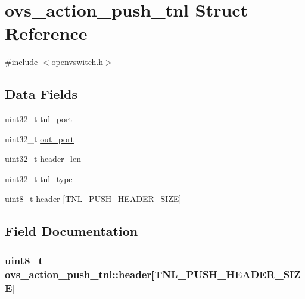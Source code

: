 \hypertarget{structovs__action__push__tnl}{}\section{ovs\+\_\+action\+\_\+push\+\_\+tnl Struct Reference}
\label{structovs__action__push__tnl}


{\ttfamily \#include $<$openvswitch.\+h$>$}

\subsection*{Data Fields}
\begin{DoxyCompactItemize}
\item 
uint32\+\_\+t \hyperlink{structovs__action__push__tnl_a075797c91bf16f67b0e99d00733de09c}{tnl\+\_\+port}
\item 
uint32\+\_\+t \hyperlink{structovs__action__push__tnl_a314ef1909bc176d1fe3f6588d24edfde}{out\+\_\+port}
\item 
uint32\+\_\+t \hyperlink{structovs__action__push__tnl_ae17c0fbdac67f4393a1bf5cc463caa61}{header\+\_\+len}
\item 
uint32\+\_\+t \hyperlink{structovs__action__push__tnl_a5a768ff0a623d03bc2b4d13db4bd4413}{tnl\+\_\+type}
\item 
uint8\+\_\+t \hyperlink{structovs__action__push__tnl_a722b423a78230e5e3dcf8586538404a5}{header} \mbox{[}\hyperlink{openvswitch_8h_a20584c44e8d74e782a3a777dcf26dfc9}{T\+N\+L\+\_\+\+P\+U\+S\+H\+\_\+\+H\+E\+A\+D\+E\+R\+\_\+\+S\+I\+Z\+E}\mbox{]}
\end{DoxyCompactItemize}


\subsection{Field Documentation}
\hypertarget{structovs__action__push__tnl_a722b423a78230e5e3dcf8586538404a5}{}
\subsubsection[{header}]{\setlength{\rightskip}{0pt plus 5cm}uint8\+\_\+t ovs\+\_\+action\+\_\+push\+\_\+tnl\+::header\mbox{[}{\bf T\+N\+L\+\_\+\+P\+U\+S\+H\+\_\+\+H\+E\+A\+D\+E\+R\+\_\+\+S\+I\+Z\+E}\mbox{]}}\label{structovs__action__push__tnl_a722b423a78230e5e3dcf8586538404a5}
\hypertarget{structovs__action__push__tnl_ae17c0fbdac67f4393a1bf5cc463caa61}{}
